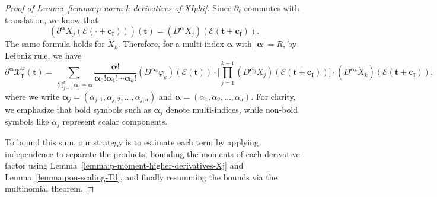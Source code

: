\documentclass[12pt]{amsart}
\theoremstyle{definition}
\theoremstyle{remark}
\newcommand{\bt}{\boldsymbol{t}}
\numberwithin{equation}{section}
\begin{document}
\begin{proof}[Proof of Lemma~\ref{lemma:p-norm-h-derivatives-of-XIphi}]
Since $\partial_\ell$ commutes with translation, we know that
\[
(\partial^{\boldsymbol{\alpha}}X_j(\mathcal{E}(\cdot+\boldsymbol{c_I})))(\bt)=(D^{\boldsymbol{\alpha}}X_j)(\mathcal{E}(\bt+\boldsymbol{c_I})).
\]
The same formula holds for $\mathring{X}_k$. Therefore, for a multi-index $\boldsymbol{\alpha}$ with $|\boldsymbol{\alpha}|=R$, by Leibniz rule, we have
\[
\partial^{\boldsymbol{\alpha}}\mathcal{X}_{\boldsymbol{I}}^\varphi(\bt)=\sum_{\sum_{j=0}^k \boldsymbol{\alpha}_j=\boldsymbol{\alpha}} \frac{\boldsymbol{\alpha}!}{\boldsymbol{\alpha}_0!\boldsymbol{\alpha}_1!\cdots \boldsymbol{\alpha}_k!}(D^{\boldsymbol{\alpha}_0} \varphi_k)(\mathcal{E}(\bt))\cdot \bigg[\prod_{j=1}^{k-1} (D^{\boldsymbol{\alpha}_j}X_j)(\mathcal{E}(\bt+\boldsymbol{c_I}))\bigg]\cdot (D^{\boldsymbol{\alpha}_k}\mathring{X}_k)(\mathcal{E}(\bt+\boldsymbol{c_I})),
\]
where we write $\boldsymbol{\alpha}_j=(\alpha_{j,1},\alpha_{j,2},\ldots,\alpha_{j,d})$ and $\boldsymbol{\alpha}=(\alpha_1,\alpha_2,\ldots,\alpha_d)$. For clarity, we emphasize that bold symbols such as $\boldsymbol{\alpha}_j$ denote multi-indices, while non-bold symbols like $\alpha_j$ represent scalar components.

To bound this sum, our strategy is to estimate each term by applying independence to separate the products, bounding the moments of each derivative factor using Lemma~\ref{lemma:p-moment-higher-derivatives-Xj} and Lemma~\ref{lemma:pou-scaling-Td}, and finally resumming the bounds via the multinomial theorem.


\end{proof}
\end{document}
